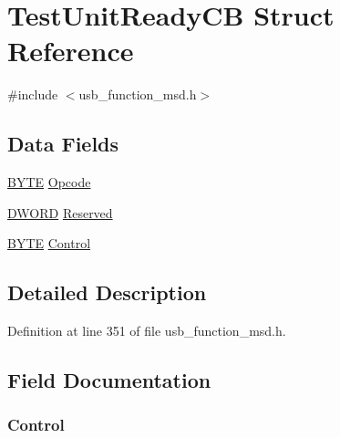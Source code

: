 \hypertarget{struct_test_unit_ready_c_b}{}\section{Test\+Unit\+Ready\+C\+B Struct Reference}
\label{struct_test_unit_ready_c_b}


{\ttfamily \#include $<$usb\+\_\+function\+\_\+msd.\+h$>$}

\subsection*{Data Fields}
\begin{DoxyCompactItemize}
\item 
\hyperlink{_generic_type_defs_8h_a4ae1dab0fb4b072a66584546209e7d58}{B\+Y\+T\+E} \hyperlink{struct_test_unit_ready_c_b_a3ac7536b907732d60214ae553910eed9}{Opcode}
\item 
\hyperlink{_generic_type_defs_8h_ad342ac907eb044443153a22f964bf0af}{D\+W\+O\+R\+D} \hyperlink{struct_test_unit_ready_c_b_a2fe98cf51e48db450cf359cdd8ffbf9b}{Reserved}
\item 
\hyperlink{_generic_type_defs_8h_a4ae1dab0fb4b072a66584546209e7d58}{B\+Y\+T\+E} \hyperlink{struct_test_unit_ready_c_b_a5dc24656c27deb12af74c98930f0bfc5}{Control}
\end{DoxyCompactItemize}


\subsection{Detailed Description}


Definition at line 351 of file usb\+\_\+function\+\_\+msd.\+h.



\subsection{Field Documentation}
\hypertarget{struct_test_unit_ready_c_b_a5dc24656c27deb12af74c98930f0bfc5}{}
\subsubsection[{Control}]{ Control}\label{struct_test_unit_ready_c_b_a5dc24656c27deb12af74c98930f0bfc5}


